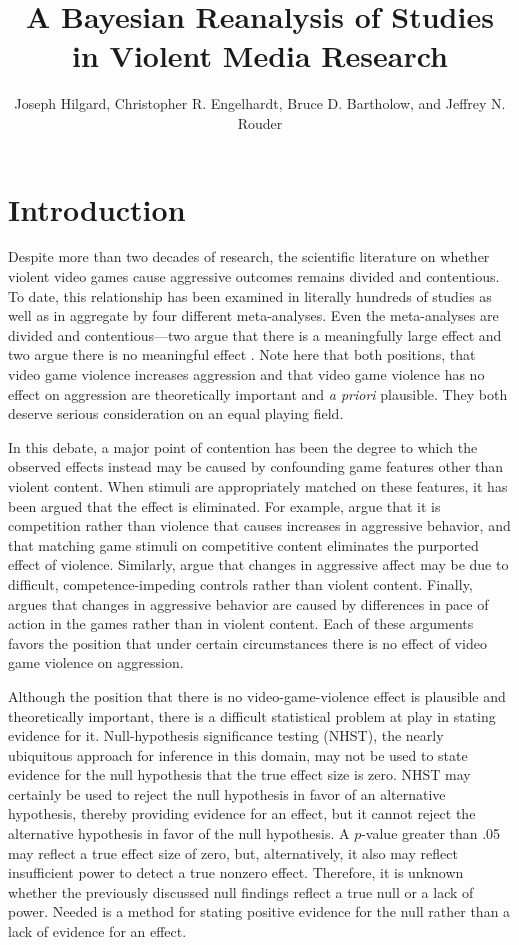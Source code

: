 \documentclass[fignum,nobf,man]{apa}
\author{Joseph Hilgard, Christopher R. Engelhardt, Bruce D. Bartholow, and Jeffrey N. Rouder}
\title{A Bayesian Reanalysis of Studies in Violent Media Research}
\affiliation{University of Missouri}
\begin{document}
\maketitle

\section*{Introduction}
Despite more than two decades of research, the scientific literature on whether violent video games cause aggressive outcomes remains divided and contentious. To date, this relationship has been examined in literally hundreds of studies as well as in aggregate by four different meta-analyses. Even the meta-analyses are divided and contentious---two argue that there is a meaningfully large effect \citep{Anderson:etal:2010,Greitemeyer:Mugge:2014} and two argue there is no meaningful effect \citep[e.g.,][]{Ferguson:Kilburn:2009,Sherry:2001}. %
Note here that both positions, that video game violence increases aggression and that video game violence has no effect on aggression are theoretically important and {\em a priori} plausible.  They both deserve serious consideration on an equal playing field.

In this debate, a major point of contention has been the degree to which the observed effects instead may be caused by confounding game features other than violent content. When stimuli are appropriately matched on these features, it has been argued that the effect is eliminated. For example, \citet{Adachi:Willoughby:2011} argue that it is competition rather than violence that causes increases in aggressive behavior, and that matching game stimuli on competitive content eliminates the purported effect of violence. Similarly, \citet{Przybylski:etal:2014} argue that changes in aggressive affect may be due to difficult, competence-impeding controls rather than violent content. Finally,  \citet{Elson:etal:2013} argues that changes in aggressive behavior are caused by differences in pace of action in the games rather than in violent content. Each of these arguments favors the position that under certain circumstances there is no effect of video game violence on aggression.

Although the position that there is no video-game-violence effect is plausible and theoretically important, there is a difficult statistical problem at play in stating evidence for it. Null-hypothesis significance testing (NHST), the nearly ubiquitous approach for inference in this domain, may not be used to state evidence for the null hypothesis that the true effect size is zero.  NHST may certainly be used to reject the null hypothesis in favor of an alternative hypothesis, thereby providing evidence for an effect, but it cannot reject the alternative hypothesis in favor of the null hypothesis. A $p$-value greater than .05 may reflect a true effect size of zero, but, alternatively, it also may reflect insufficient power to detect a true nonzero effect. Therefore, it is unknown whether the previously discussed null findings reflect a true null or a lack of power.    Needed is a method for stating positive evidence for the null rather than a lack of evidence for an effect.
\end{document}
